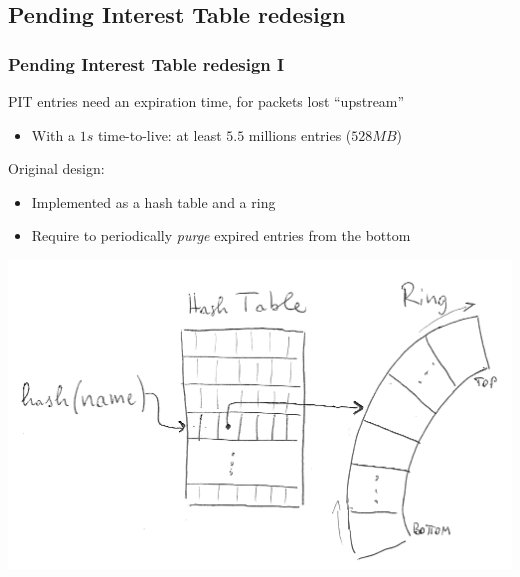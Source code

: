 \subsection{Pending Interest Table redesign}
\begin{frame}[fragile]
  \frametitle{Pending Interest Table redesign I}
  PIT entries need an expiration time, for packets lost ``upstream''
  \vspace{-6pt}
  \begin{itemize}
    \item With a $1 s$ time-to-live: at least $5.5$ millions entries ($528 MB$)
  \end{itemize}
  Original design:
  \vspace{-6pt}
  \begin{itemize}
    \item Implemented as a hash table and a ring
    \item Require to periodically \emph{purge} expired entries from the bottom
  \end{itemize}
  \vspace{-18pt}
  \begin{center}
    \includegraphics[width=.70\linewidth]{img/old_pit_sketch_trans.png}
  \end{center}


\end{frame}
